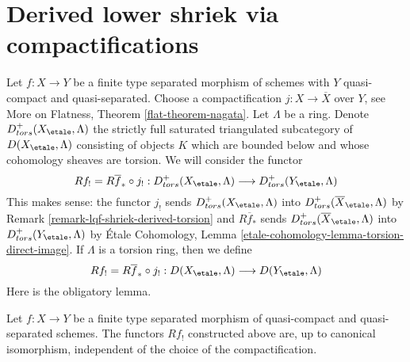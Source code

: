 \section{Derived lower shriek via compactifications}
\label{section-derived-lower-shriek-compactification}

\noindent
Let $f : X \to Y$ be a finite type separated morphism of schemes
with $Y$ quasi-compact and quasi-separated. Choose a compactification
$j : X \to \overline{X}$ over $Y$, see
More on Flatness, Theorem \ref{flat-theorem-nagata}.
Let $\Lambda$ be a ring. Denote $D^+_{tors}(X_\etale, \Lambda)$
the strictly full saturated triangulated subcategory of
$D(X_\etale, \Lambda)$ consisting of objects $K$ which are bounded below
and whose cohomology sheaves are torsion. We will consider the
functor
$$
Rf_! = R\overline{f}_* \circ j_! :
D^+_{tors}(X_\etale, \Lambda)
\longrightarrow
D^+_{tors}(Y_\etale, \Lambda)
$$
This makes sense: the functor $j_!$ sends $D^+_{tors}(X_\etale, \Lambda)$ into
$D^+_{tors}(\overline{X}_\etale, \Lambda)$ by
Remark \ref{remark-lqf-shriek-derived-torsion} and $R\overline{f}_*$ sends
$D^+_{tors}(\overline{X}_\etale, \Lambda)$ into $D^+_{tors}(Y_\etale, \Lambda)$
by \'Etale Cohomology, Lemma \ref{etale-cohomology-lemma-torsion-direct-image}.
If $\Lambda$ is a torsion ring, then we define
$$
Rf_! = R\overline{f}_* \circ j_! :
D(X_\etale, \Lambda)
\longrightarrow
D(Y_\etale, \Lambda)
$$
Here is the obligatory lemma.

\begin{lemma}
\label{lemma-shriek-well-defined}
Let $f : X \to Y$ be a finite type separated morphism of quasi-compact
and quasi-separated schemes. The functors $Rf_!$ constructed above
are, up to canonical isomorphism, independent of the choice of the
compactification.
\end{lemma}

